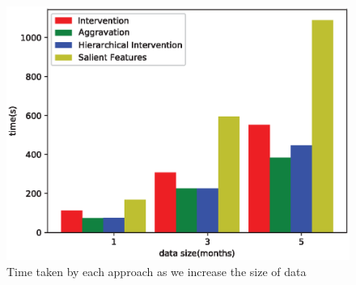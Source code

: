 \begin{figure}[h]
	\includegraphics[width=\columnwidth]{images/performance.eps}
	\caption{Time taken by each approach as we increase the size of data}
	\label{fig:performance}
\end{figure}
